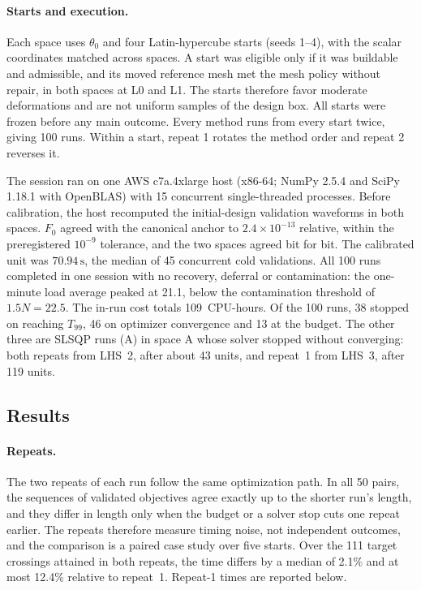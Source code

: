 \paragraph{Starts and execution.}
Each space uses $\theta_0$ and four Latin-hypercube starts (seeds 1--4),
with the scalar coordinates matched across spaces. A start was eligible
only if it was buildable and admissible, and its moved reference mesh met
the mesh policy without repair, in both spaces at L0 and L1. The starts
therefore favor moderate deformations and are not uniform samples of the
design box. All starts were frozen before any main outcome. Every method
runs from every start twice, giving 100 runs. Within a start, repeat 1
rotates the method order and repeat 2 reverses it.

The session ran on one AWS c7a.4xlarge host (x86-64; NumPy 2.5.4 and
SciPy 1.18.1 with OpenBLAS) with 15 concurrent single-threaded processes.
Before calibration, the host recomputed the initial-design validation
waveforms in both spaces. $F_0$ agreed with the canonical anchor to
$2.4\times10^{-13}$ relative, within the preregistered $10^{-9}$ tolerance,
and the two spaces agreed bit for bit. The calibrated unit was
$70.94\,\mathrm{s}$, the median of 45 concurrent cold validations. All 100
runs completed in one session with no recovery, deferral or contamination:
the one-minute load average peaked at 21.1, below the contamination
threshold of $1.5N=22.5$. The in-run cost totals 109~CPU-hours. Of the
100 runs, 38 stopped on reaching $T_{99}$, 46 on optimizer convergence and
13 at the budget. The other three are SLSQP runs (A) in space A whose
solver stopped without converging: both repeats from LHS~2, after about 43
units, and repeat~1 from LHS~3, after 119 units.

\subsection{Results}
\paragraph{Repeats.}
The two repeats of each run follow the same optimization path. In all 50
pairs, the sequences of validated objectives agree exactly up to the
shorter run's length, and they differ in length only when the budget or a
solver stop cuts one repeat earlier. The repeats therefore measure timing
noise, not independent outcomes, and the comparison is a paired case study
over five starts. Over the 111 target crossings attained in both repeats,
the time differs by a median of 2.1\% and at most 12.4\% relative to
repeat~1. Repeat-1 times are reported below.

